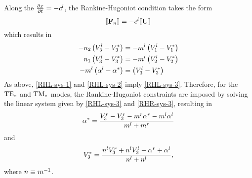 Along the $\frac{\partial x}{\partial t} = - c^l$, the Rankine-Hugoniot condition takes the form
$$
\llbracket  \mathbf{F}_n  \rrbracket = - c^l \llbracket  \mathbf{U}  \rrbracket
$$
which results in
\begin{align}
-n_2 \left(V_3^l - V_3^* \right) &= - m^l \left( V_1^l - V_1^* \right) \label{RHL-sys-1} \\
n_1 \left(V_3^l - V_3^* \right) &= - m^l  \left( V_2^l - V_2^* \right) \label{RHL-sys-2} \\
- m^l \left( \alpha^l - \alpha^* \right) &= \left( V_3^l - V_3^* \right) \label{RHL-sys-3}
\end{align}
As above, \eqref{RHL-sys-1} and \eqref{RHL-sys-2} imply \eqref{RHL-sys-3}.
Therefore, for the $\textrm{TE}_{z}$ and $\textrm{TM}_{z}$ modes, the Rankine-Hugoniot constraints are
imposed by solving the linear system given by \eqref{RHL-sys-3} and
\eqref{RHR-sys-3}, resulting in
\begin{equation}
\alpha^* = \frac{V_3^r - V_3^r - m^r \alpha^r - m^l \alpha^l}{m^l + m^r}\label{eq:interfce-bc-alphaGeneral}
\end{equation}
and
\begin{equation}
  V_3^* =
  \frac{
    n^l V_3^r + n^l V_3^l - \alpha^r + \alpha^l
  }{
    n^l + n^l
    } , \label{eq:interface-bc-V3}
\end{equation}
where $n \equiv m^{-1}$.

